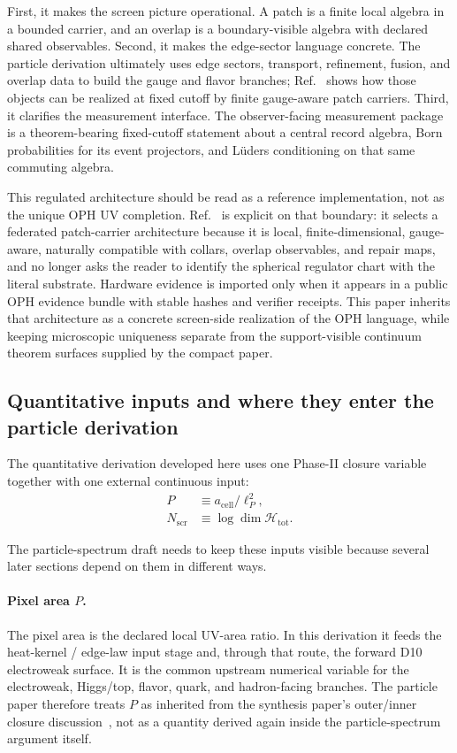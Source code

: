 \documentclass[11pt]{article}
\begin{document}
First, it makes the screen picture operational. A patch is a finite local
algebra in a bounded carrier, and an overlap is a boundary-visible algebra with declared shared
observables. Second, it makes the edge-sector
language concrete. The particle derivation ultimately uses edge sectors, transport, refinement,
fusion, and overlap data to build the gauge and flavor branches; Ref.~\cite{ophmicrophysics} shows
how those objects can be realized at fixed cutoff by finite gauge-aware patch carriers.
Third, it clarifies the measurement interface. The observer-facing measurement package is a
theorem-bearing fixed-cutoff statement about a central record algebra, Born probabilities for its
event projectors, and L\"uders conditioning on that same commuting algebra.

This regulated architecture should be read as a reference implementation, not as the unique OPH
UV completion. Ref.~\cite{ophmicrophysics} is explicit on that boundary: it selects a federated
patch-carrier architecture because it is local, finite-dimensional, gauge-aware, naturally
compatible with collars, overlap observables, and repair maps, and no longer asks the reader to
identify the spherical regulator chart with the literal substrate. Hardware evidence is imported
only when it appears in a public OPH evidence bundle with stable hashes and verifier receipts.
This paper inherits that architecture as a concrete screen-side realization of the OPH language,
while keeping microscopic uniqueness separate from the support-visible continuum theorem surfaces
supplied by the compact paper.

\subsection{Quantitative inputs and where they enter the particle derivation}

The quantitative derivation developed here uses one Phase-II closure variable together with one
external continuous input:
\begin{align}
P &\equiv a_{\mathrm{cell}}/\ell_P^2,\\
N_{\mathrm{scr}} &\equiv \log \dim \mathcal H_{\mathrm{tot}}.
\end{align}

The particle-spectrum draft needs to keep these inputs visible because several later sections
depend on them in different ways.

\paragraph{Pixel area \(P\).}
The pixel area is the declared local UV-area ratio. In this derivation it feeds the heat-kernel /
edge-law input stage and, through that route, the forward D10 electroweak surface. It is the
common upstream numerical variable for the electroweak, Higgs/top, flavor, quark, and
hadron-facing branches. The particle paper therefore treats \(P\) as inherited from the synthesis
paper's outer/inner closure discussion~\cite{ophsynthesis}, not as a quantity derived again inside
the particle-spectrum argument itself.
\end{document}
